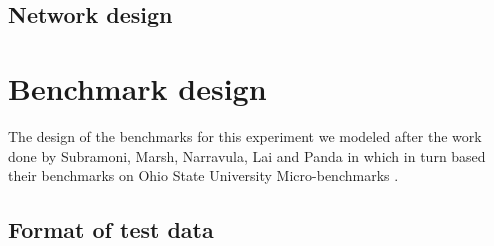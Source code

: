 \documentclass{thesis}
\begin{document}
\subsection{Network design}


\section{Benchmark design}

The design of the benchmarks for this experiment we modeled after the work done by Subramoni, Marsh, Narravula, Lai and Panda in \cite{Subramoni} which in turn based their benchmarks on Ohio State University Micro-benchmarks \cite{OSU_MICRO_BENCHMARKS}.




\subsection{Format of test data}




\end{document}
